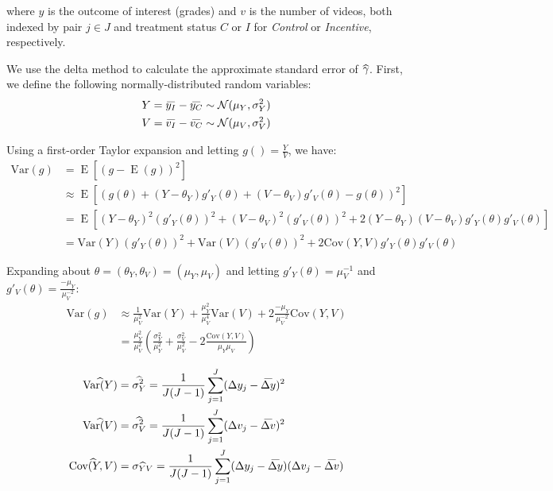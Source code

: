 \documentclass[12pt]{article}
\newcommand\wh[1]{\hstretch{2}{\hat{\hstretch{.5}{#1}}}}
\newcommand\wb[1]{\hstretch{2}{\bar{\hstretch{.5}{#1}}}}
\begin{document}
where $y$ is the outcome of interest (grades) and $v$ is the number of videos, both indexed by pair $j\in J$ and treatment status $C$ or $I$ for \textit{Control} or \textit{Incentive}, respectively.

We use the delta method to calculate the approximate standard error of $\wh{\gamma}$.
First, we define the following normally-distributed random variables:
\begin{equation}
\begin{split}
Y = \wb{y_I} - \wb{y_C} \sim \mathcal{N}(\mu_Y, \sigma^2_Y) \\
V = \wb{v_I} - \wb{v_C} \sim \mathcal{N}(\mu_V, \sigma^2_V)
\end{split}\label{eq:equation1}
\end{equation}

Using a first-order Taylor expansion and letting $g() = \frac{Y}{V}$, we have:
\begin{equation}
\begin{split}
	\text{Var}(g) & = \operatorname{E}[(g - \operatorname{E}(g))^2] \\
	& \approx \operatorname{E}[(g(\theta) + (Y-\theta_Y)g'_Y(\theta) + (V-\theta_V)g'_V(\theta) - g(\theta))^2] \\
	& = \operatorname{E}[(Y-\theta_Y)^2 (g'_Y(\theta))^2 + (V-\theta_V)^2 (g'_V(\theta))^2 + 2(Y-\theta_Y)(V-\theta_V)g'_Y(\theta)g'_V(\theta)] \\
	& = \text{Var}(Y)(g'_Y(\theta))^2 + \text{Var}(V)(g'_V(\theta))^2 + 2\text{Cov}(Y,V)g'_Y(\theta)g'_V(\theta)
\end{split}\label{eq:equation2}
\end{equation}

Expanding about $\theta=(\theta_Y,\theta_V)=(\mu_Y,\mu_V)$ and letting $g'_Y(\theta) = \mu_V^{-1}$ and $g'_V(\theta) = \frac{-\mu_Y}{\mu_V^{-2}}$:
\begin{equation} \label{eq:var_expanded}
\begin{split}
	\text{Var}(g) & \approx \frac{1}{\mu_V^2}\text{Var}(Y) + \frac{\mu_Y^2}{\mu_V^4}\text{Var}(V) + 2\frac{-\mu_Y}{\mu_V^{-2}}\text{Cov}(Y,V) \\
	& = \frac{\mu_Y^2}{\mu_V^2}(\frac{\sigma_Y^2}{\mu_Y^2} + \frac{\sigma_V^2}{\mu_V^2} - 2\frac{\text{Cov}(Y,V)}{\mu_Y \mu_V})
\end{split}
\end{equation}

\begin{equation}
\begin{split}
\wh{\text{Var}(Y)} & = \wh{\sigma_Y^2} = \frac{1}{J(J-1)}\sum_{j=1}^{J} (\Delta y_j - \wb{\Delta y})^2 \\
\wh{\text{Var}(V)} & = \wh{\sigma_V^2} = \frac{1}{J(J-1)}\sum_{j=1}^{J} (\Delta v_j - \wb{\Delta v})^2 \\
\wh{\text{Cov}(Y,V)} & = \wh{\sigma_{YV}} = \frac{1}{J(J-1)}\sum_{j=1}^{J} (\Delta y_j - \wb{\Delta y})(\Delta v_j - \wb{\Delta v})
\end{split}\label{eq:equation3}
\end{equation}
\end{document}
